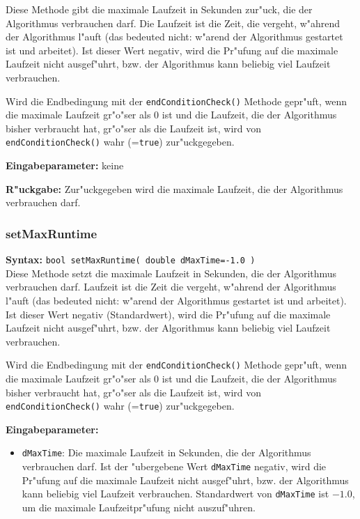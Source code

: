 Diese Methode gibt die maximale Laufzeit in Sekunden zur"uck, die der Algorithmus verbrauchen darf. Die Laufzeit ist die Zeit, die vergeht, w"ahrend der Algorithmus l"auft (das bedeuted nicht: w"arend der Algorithmus gestartet ist und arbeitet). Ist dieser Wert negativ, wird die Pr"ufung auf die maximale Laufzeit nicht ausgef"uhrt, bzw. der Algorithmus kann beliebig viel Laufzeit verbrauchen.

Wird die Endbedingung mit der \verb|endConditionCheck()| Methode gepr"uft, wenn die maximale Laufzeit gr"o"ser als $0$ ist und die Laufzeit, die der Algorithmus bisher verbraucht hat, gr"o"ser als die Laufzeit ist, wird von \verb|endConditionCheck()| wahr (=\verb|true|) zur"uckgegeben.

\bigskip\noindent
\textbf{Eingabeparameter:} keine

\bigskip\noindent
\textbf{R"uckgabe:} Zur"uckgegeben wird die maximale Laufzeit, die der Algorithmus verbrauchen darf.


\subsubsection{setMaxRuntime}

\textbf{Syntax:} \verb|bool setMaxRuntime( double dMaxTime=-1.0 )| \\

Diese Methode setzt die maximale Laufzeit in Sekunden, die der Algorithmus verbrauchen darf. Laufzeit ist die Zeit die vergeht, w"ahrend der Algorithmus l"auft (das bedeuted nicht: w"arend der Algorithmus gestartet ist und arbeitet). Ist dieser Wert negativ (Standardwert), wird die Pr"ufung auf die maximale Laufzeit nicht ausgef"uhrt, bzw. der Algorithmus kann beliebig viel Laufzeit verbrauchen.

Wird die Endbedingung mit der \verb|endConditionCheck()| Methode gepr"uft, wenn die maximale Laufzeit gr"o"ser als $0$ ist und die Laufzeit, die der Algorithmus bisher verbraucht hat, gr"o"ser als die Laufzeit ist, wird von \verb|endConditionCheck()| wahr (=\verb|true|) zur"uckgegeben.

\bigskip\noindent
\textbf{Eingabeparameter:}
\begin{itemize}
 \item \verb|dMaxTime|: Die maximale Laufzeit in Sekunden, die der Algorithmus verbrauchen darf. Ist der "ubergebene Wert \verb|dMaxTime| negativ, wird die Pr"ufung auf die maximale Laufzeit nicht ausgef"uhrt, bzw. der Algorithmus kann beliebig viel Laufzeit verbrauchen. Standardwert von \verb|dMaxTime| ist $-1.0$, um die maximale Laufzeitpr"ufung nicht auszuf"uhren.
\end{itemize}

